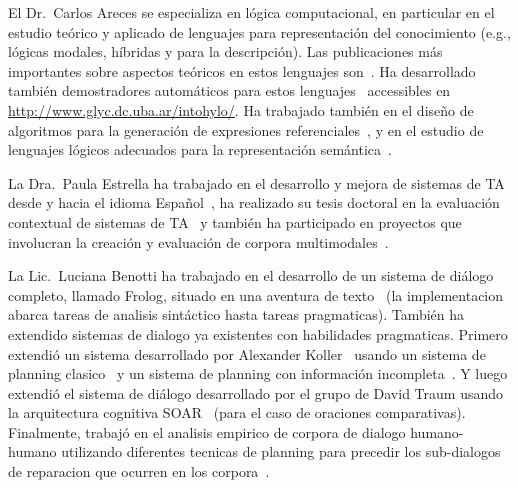 \begin{myitemize}

\item El Dr.\ Carlos Areces se especializa en l\'ogica computacional,
en particular en el estudio te\'orico y aplicado de lenguajes para
representaci\'on del conocimiento (e.g., l\'ogicas modales, h\'ibridas y
para la descripci\'on).  Las publicaciones
m\'as importantes sobre aspectos te\'oricos en estos lenguajes
son~\citep{ABM01,arec:hybr05b}.  Ha desarrollado tambi\'en demostradores
autom\'aticos para estos lenguajes~\citep{ANR01,arec:hylo02a,AG06,Hoffmann2007}
accessibles en \url{http://www.glyc.dc.uba.ar/intohylo/}.
Ha trabajado tambi\'en en el dise\~no de algoritmos para la generaci\'on de
expresiones referenciales~\citep{AKS08}, y en el estudio de lenguajes l\'ogicos
adecuados para la representaci\'on sem\'antica~\citep{AF08}.



\item La Dra.\ Paula Estrella ha trabajado en el desarrollo y mejora de sistemas de TA desde y hacia el idioma Espa\~nol~\citep{estr:expe05}, ha realizado su tesis doctoral en la evaluaci\'on contextual de sistemas de TA~\citep{estr:impr08, estr:femt09} y tambi\'en ha participado en proyectos que involucran la creaci\'on y evaluaci\'on de corpora multimodales~\citep{pope:estr07}.

\item La Lic.\ Luciana Benotti ha trabajado en el desarrollo de un sistema de
di\'alogo completo, llamado Frolog, situado en una aventura de
texto~\citep{benotti09b} (la implementacion abarca tareas de analisis
sint\'actico hasta tareas pragmaticas). Tambi\'en ha extendido sistemas de
dialogo ya existentes con habilidades pragmaticas. Primero extendi\'o un
sistema desarrollado por Alexander Koller~\citep{koller04} usando un sistema de
planning clasico~\citep{benotti07} y un sistema de planning con informaci\'on
incompleta~\citep{benotti08}. Y luego extendi\'o el sistema de di\'alogo
desarrollado por el grupo de David Traum usando la arquitectura cognitiva
SOAR~\citep{benotti09a} (para el caso de oraciones comparativas). Finalmente,
trabaj\'o en el analisis empirico de corpora de dialogo humano-humano utilizando
diferentes tecnicas de planning para precedir los sub-dialogos de reparacion que
ocurren en los corpora~\citep{benotti09c}.



\end{myitemize}
